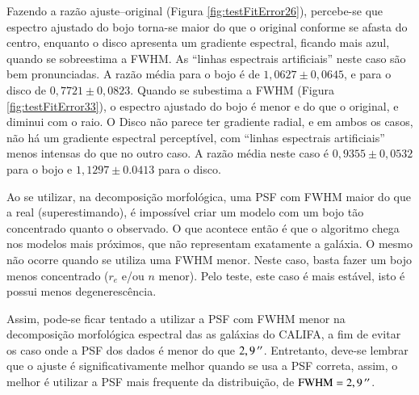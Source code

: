 Fazendo a razão ajuste--original (Figura \ref{fig:testFitError26}), percebe-se
que espectro ajustado do bojo torna-se maior do que o original conforme se
afasta do centro, enquanto o disco apresenta um gradiente espectral, ficando
mais azul, quando se sobreestima a FWHM. As ``linhas espectrais artificiais''
neste caso são bem pronunciadas. A razão média para o bojo é de $1,0627 \pm
0,0645$, e para o disco de $0,7721 \pm 0,0823$. Quando se subestima a FWHM
(Figura \ref{fig:testFitError33}), o espectro ajustado do bojo é menor e do que
o original, e diminui com o raio. O Disco não parece ter gradiente radial, e em
ambos os casos, não há um gradiente espectral perceptível, com ``linhas
espectrais artificiais'' menos intensas do que no outro caso. A razão média
neste caso é $0,9355 \pm 0,0532$ para o bojo e $1,1297 \pm 0.0413$ para o disco.

Ao se utilizar, na decomposição morfológica, uma PSF com FWHM maior do que a
real (superestimando), é impossível criar um modelo com um bojo tão concentrado
quanto o observado. O que acontece então é que o algoritmo chega nos modelos
mais próximos, que não representam exatamente a galáxia. O mesmo não ocorre
quando se utiliza uma FWHM menor. Neste caso, basta fazer um bojo menos
concentrado ($r_e$ e/ou $n$ menor). Pelo teste, este caso é mais estável, isto é
possui menos degenerescência.

Assim, pode-se ficar tentado a utilizar a PSF com FWHM menor na decomposição
morfológica espectral das as galáxias do CALIFA, a fim de evitar os caso onde a
PSF dos dados é menor do que $2,9\,^{\prime\prime}$. Entretanto, deve-se lembrar que o
ajuste é significativamente melhor quando se usa a PSF correta, assim, o melhor
é utilizar a PSF mais frequente da distribuição, de $\mathrm{FWHM} =
2,9\,^{\prime\prime}$.


